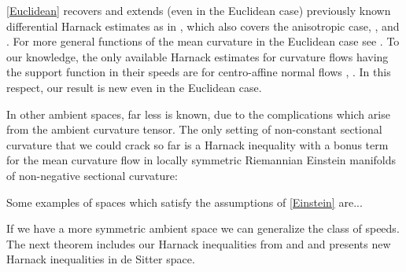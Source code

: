 \cref{Euclidean} recovers and extends (even in the Euclidean case) previously known differential Harnack estimates as in \cite{Andrews:09/1994}, which also covers the anisotropic case, \cite{Chow:06/1991}, \cite{Li:/2011} and \cite{Wang:11/2007}. For more general functions of the mean curvature in the Euclidean case see \cite{Smoczyk:/1997}. To our knowledge, the only available Harnack estimates for curvature flows having the support function in their speeds are for centro-affine normal flows \cite{Ivaki:11/2015}, \cite{Ivaki:09/2015}. In this respect, our result is new even in the Euclidean case.

In other ambient spaces, far less is known, due to the complications which arise from the ambient curvature tensor.
The only setting of non-constant sectional curvature that we could crack so far is a Harnack inequality with a bonus term for the mean curvature flow in locally symmetric Riemannian Einstein manifolds of non-negative sectional curvature:

{\color{red} Some examples of spaces which satisfy the assumptions of \cref{Einstein} are...}


If we have a more symmetric ambient space we can generalize the class of speeds. The next theorem includes our Harnack inequalities from \cite{BryanIvaki:08/2015} and \cite{BIS1} and presents new Harnack inequalities in de Sitter space.

